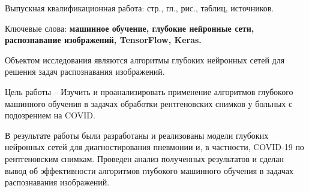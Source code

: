 
Выпускная квалификационная работа: \pageref{LastPage} стр., 
 гл., 
\totalfigures{} рис.,
\totaltables{} таблиц,
 источников.

Ключевые слова: \textbf{машинное обучение, глубокие нейронные сети, распознавание изображений, TensorFlow, Keras.}

Объектом исследования являются алгоритмы глубоких нейронных сетей для решения задач распознавания изображений. 

Цель работы –  Изучить и проанализировать применение алгоритмов глубокого машинного обучения  в задачах обработки рентгеновских снимков у больных с подозрением на COVID.

В результате работы были разработаны и реализованы модели глубоких нейронных сетей для диагностирования пневмонии и, в частности, COVID-19 по рентгеновским снимкам. Проведен анализ полученных результатов и сделан вывод об эффективности алгоритмов глубокого машинного обучения в задачах распознавания изображений.

\clearpage